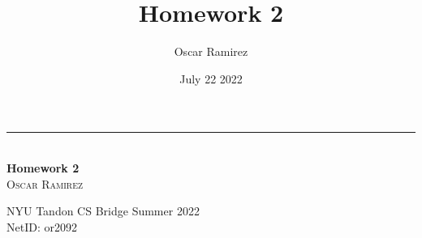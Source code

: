 \documentclass[12pt, letterpaper, twoside]{article}
\title{\textbf{Homework 2}}
\author{Oscar Ramirez}
\date{July 22 2022}
\begin{document}
\begin{titlepage}   

    \raggedleft %

    \rule{1pt}{\textheight} %
    \hspace{0.05\textwidth} %
    \parbox[b]{0.75\textwidth}{ %
        {\large\textit{}}\\[4\baselineskip]

        {\Huge\bfseries Homework 2}\\[2\baselineskip] %

        {\Large\textsc{Oscar Ramirez}} %

        \vspace{0.47\textheight} %
        {\noindent NYU Tandon CS Bridge Summer 2022}\\[0.1\baselineskip]
        {\noindent NetID: or2092}\\[\baselineskip]
    }

\end{titlepage}
\newpage
\end{document}

